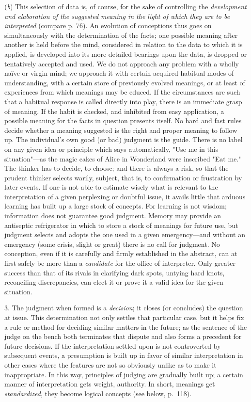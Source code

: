 \documentclass[letterpaper]{book}
\begin{document}
(\emph{b}) This selection of data is, of course, for the sake of
controlling the \emph{development and elaboration of the suggested
meaning in the light of which they are to be interpreted} (compare p.
76). An evolution of conceptions thus goes on simultaneously with the
determination of the facts; one possible meaning after another is held
before the mind, considered in relation to the data to which it is
applied, is developed into its more detailed bearings upon the data, is
dropped or tentatively accepted and used. We do not approach any problem
with a wholly naïve or virgin mind; we approach it with certain acquired
habitual modes of understanding, with a certain store of previously
evolved meanings, or at least of experiences from which meanings may be
educed. If the circumstances are such that a habitual response is called
directly into play, there is an immediate grasp of meaning. If the habit
is checked, and inhibited from easy application, a possible meaning for
the facts in question presents itself. No hard and fast rules decide
whether a meaning suggested is the right and proper meaning to follow
up. The individual's own good (or bad) judgment is the guide. There is
no label on any given idea or principle which says automatically, "Use
me in this situation"---as the magic cakes of Alice in Wonderland were
inscribed "Eat me." The thinker has to decide, to choose; and there is
always a risk, so that the prudent thinker selects warily, subject, that
is, to confirmation or frustration by later events. If one is not able
to estimate wisely what is relevant to the interpretation of a given
perplexing or doubtful issue, it
avails
little that arduous learning has built up a large stock of concepts. For
learning is not wisdom; information does not guarantee good judgment.
Memory may provide an antiseptic refrigerator in which to store a stock
of meanings for future use, but judgment selects and adopts the one used
in a given emergency---and without an emergency (some crisis, slight or
great) there is no call for judgment. No conception, even if it is
carefully and firmly established in the abstract, can at first safely be
more than a \emph{candidate} for the office of interpreter. Only greater
success than that of its rivals in clarifying dark spots, untying hard
knots, reconciling discrepancies, can elect it or prove it a valid idea
for the given situation.


3. The judgment when formed is a \emph{decision}; it closes (or
concludes) the question at issue. This determination not only settles
that particular case, but it helps fix a rule or method for deciding
similar matters in the future; as the sentence of the judge on the bench
both terminates that dispute and also forms a precedent for future
decisions. If the interpretation settled upon is not controverted by
subsequent events, a presumption is built up in favor of similar
interpretation in other cases where the features are not so obviously
unlike as to make it inappropriate. In this way, principles of judging
are gradually built up; a certain manner of interpretation gets weight,
authority. In short, meanings get \emph{standardized}, they become
logical concepts (see below, p.\ 118).
\end{document}
